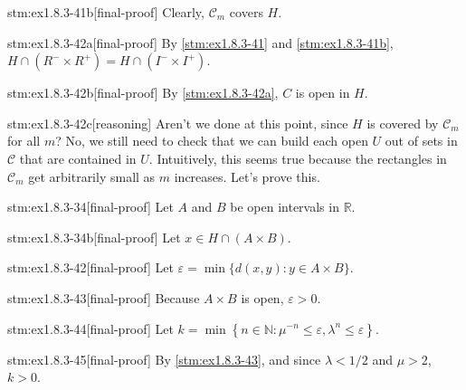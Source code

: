 \begin{stm}{stm:ex1.8.3-41b}[final-proof]
Clearly, $\mathcal{C}_m$ covers $H$.
\end{stm}

\begin{stm}{stm:ex1.8.3-42a}[final-proof]
By \ref{stm:ex1.8.3-41} and \ref{stm:ex1.8.3-41b}, $H \cap (R^- \times R^+) = H \cap (I^- \times I^+)$.
\end{stm}

\begin{stm}{stm:ex1.8.3-42b}[final-proof]
By \ref{stm:ex1.8.3-42a}, $C$ is open in $H$.
\end{stm}

\begin{stm}{stm:ex1.8.3-42c}[reasoning]
Aren’t we done at this point, since $H$ is covered by $\mathcal{C}_m$ for all $m$? No, we still need to check that we can build each open $U$ out of sets in $\mathcal{C}$ that are contained in $U$. Intuitively, this seems true because the rectangles in $\mathcal{C}_m$ get arbitrarily small as $m$ increases. Let's prove this.
\end{stm}

\begin{stm}{stm:ex1.8.3-34}[final-proof]
Let $A$ and $B$ be open intervals in $\mathbb{R}$.
\end{stm}

\begin{stm}{stm:ex1.8.3-34b}[final-proof]
Let $x \in H \cap (A \times B)$.
\end{stm}

\begin{stm}{stm:ex1.8.3-42}[final-proof]
Let $\varepsilon = \min\{ d(x, y) : y \in A \times B \}$. 
\end{stm}

\begin{stm}{stm:ex1.8.3-43}[final-proof]
Because $A \times B$ is open, $\varepsilon > 0$.
\end{stm}

\begin{stm}{stm:ex1.8.3-44}[final-proof]
Let $k = \min \left\{ n \in \mathbb{N} : \mu^{-n} \leq \varepsilon, \lambda^n \leq \varepsilon \right\}$.
\end{stm}

\begin{stm}{stm:ex1.8.3-45}[final-proof]
By \ref{stm:ex1.8.3-43}, and since $\lambda < 1/2$ and $\mu > 2$, $k > 0$.
\end{stm}

